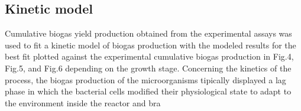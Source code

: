 \subsection{Kinetic model}
Cumulative biogas yield production obtained from the experimental assays was used to fit a kinetic model of biogas production with the modeled results for the best fit plotted against the experimental cumulative biogas production in Fig.4, Fig.5, and Fig.6 depending on the growth stage.
Concerning the kinetics of the process, the biogas production of the microorganisms tipically displayed a lag phase in which the bacterial cells modified their physiological state to adapt to the environment inside the reactor and bra